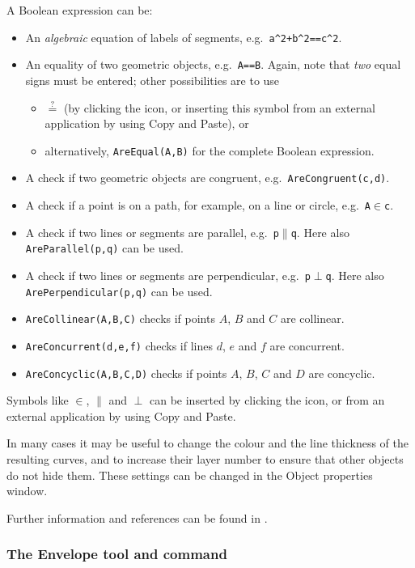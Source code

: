 \documentclass{article}
\begin{document}
A Boolean expression can be:
\begin{itemize}
\item An \textit{algebraic} equation of labels of segments, e.g.~\texttt{a\^{}2+b\^{}2==c\^{}2}.
\item An equality of two geometric objects, e.g.~\texttt{A==B}. Again, note that \textit{two} equal signs must be entered; other possibilities are to use
\begin{itemize}
    \item $\stackrel{?}{=}$ (by clicking the \framebox{$\alpha$} icon, or inserting this symbol from an external application by using Copy and Paste), or
    \item alternatively, \texttt{AreEqual(A,B)} for the complete Boolean expression.
\end{itemize}
\item A check if two geometric objects are congruent, e.g.~\texttt{AreCongruent(c,d)}.
\item A check if a point is on a path, for example, on a line or circle, e.g.~\texttt{A$\in$c}.
\item A check if two lines or segments are parallel, e.g.~\texttt{p$\parallel$q}. Here also \texttt{AreParallel(p,q)} can be used.
\item A check if two lines or segments are perpendicular, e.g.~\texttt{p$\perp$q}. Here also \texttt{ArePerpendicular(p,q)} can be used.
\item \texttt{AreCollinear(A,B,C)} checks if points $A$, $B$ and $C$ are collinear.
\item \texttt{AreConcurrent(d,e,f)} checks if lines $d$, $e$ and $f$ are concurrent.
\item \texttt{AreConcyclic(A,B,C,D)} checks if points $A$, $B$, $C$ and $D$ are concyclic.
\end{itemize}
Symbols like $\in$, $\parallel$ and $\perp$ can be inserted by clicking the \framebox{$\alpha$} icon, or from an external application by using Copy and Paste.

In many cases it may be useful to change the colour and the line thickness of the resulting curves, and to increase their layer number to ensure that other objects do not hide them. These settings can be changed in the Object properties window.

Further information and references can be found in \cite{AbanadesBotanaKovacsRecioSolyomGecse}.

\subsubsection{The Envelope tool and command}
\end{document}
